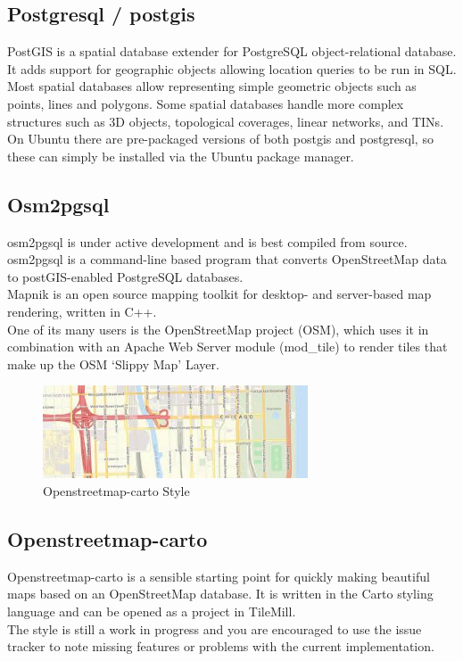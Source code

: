 \subsection{Postgresql / postgis}
PostGIS is a spatial database extender for PostgreSQL object-relational database. It adds support for geographic objects allowing location queries to be run in SQL.\\
Most spatial databases allow representing simple geometric objects such as points, lines and polygons. Some spatial databases handle more complex structures such as 3D objects, topological coverages, linear networks, and TINs.\\
On Ubuntu there are pre-packaged versions of both postgis and postgresql, so these can simply be installed via the Ubuntu package manager.\\
\subsection{Osm2pgsql}
 osm2pgsql is under active development and is best compiled from source.\\
osm2pgsql is a command-line based program that converts OpenStreetMap data to postGIS-enabled PostgreSQL databases.\\
Mapnik is an open source mapping toolkit for desktop- and server-based map rendering, written in C++.\\
One of its many users is the OpenStreetMap project (OSM), which uses it in combination with an Apache Web Server module (mod\_tile) to render tiles that make up the OSM ‘Slippy Map’ Layer.\\
\begin{figure}[!ht]
\centering
\includegraphics[width=0.7\textwidth]{input/images/bright.jpeg}                   
\caption{Openstreetmap-carto Style}
\hspace{-1.5em}
\end{figure}



\subsection{Openstreetmap-carto}
Openstreetmap-carto is a sensible starting point for quickly making beautiful maps based on an OpenStreetMap database. It is written in the Carto styling language and can be opened as a project in TileMill.\\
The style is still a work in progress and you are encouraged to use the issue tracker to note missing features or problems with the current implementation.\\
